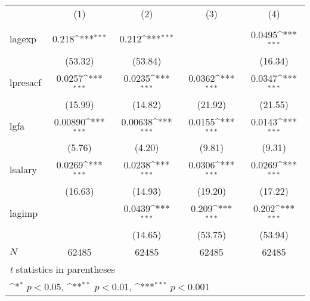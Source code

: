 {
\def\sym#1{\ifmmode^{#1}\else\(^{#1}\)\fi}
\begin{tabular}{l*{4}{c}}
\hline\hline
            &\multicolumn{1}{c}{(1)}&\multicolumn{1}{c}{(2)}&\multicolumn{1}{c}{(3)}&\multicolumn{1}{c}{(4)}\\
            &\multicolumn{1}{c}{} &\multicolumn{1}{c}{} &\multicolumn{1}{c}{} &\multicolumn{1}{c}{} \\
\hline
lagexp      &       0.218\sym{***}&       0.212\sym{***}&                     &      0.0495\sym{***}\\
            &     (53.32)         &     (53.84)         &                     &     (16.34)         \\
[1em]
lpresacf    &      0.0257\sym{***}&      0.0235\sym{***}&      0.0362\sym{***}&      0.0347\sym{***}\\
            &     (15.99)         &     (14.82)         &     (21.92)         &     (21.55)         \\
[1em]
lgfa        &     0.00890\sym{***}&     0.00638\sym{***}&      0.0155\sym{***}&      0.0143\sym{***}\\
            &      (5.76)         &      (4.20)         &      (9.81)         &      (9.31)         \\
[1em]
lsalary     &      0.0269\sym{***}&      0.0238\sym{***}&      0.0306\sym{***}&      0.0269\sym{***}\\
            &     (16.63)         &     (14.93)         &     (19.20)         &     (17.22)         \\
[1em]
lagimp      &                     &      0.0439\sym{***}&       0.209\sym{***}&       0.202\sym{***}\\
            &                     &     (14.65)         &     (53.75)         &     (53.94)         \\
\hline
\(N\)       &       62485         &       62485         &       62485         &       62485         \\
\hline\hline
\multicolumn{5}{l}{\footnotesize \textit{t} statistics in parentheses}\\
\multicolumn{5}{l}{\footnotesize \sym{*} \(p<0.05\), \sym{**} \(p<0.01\), \sym{***} \(p<0.001\)}\\
\end{tabular}
}
